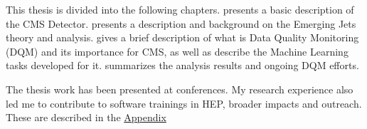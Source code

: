 This thesis is divided into the following chapters.
 presents a basic description of the CMS Detector.
 presents a description and background on the Emerging Jets theory and analysis.
 gives a brief description of what is Data Quality Monitoring (DQM) and its importance for CMS, as well as describe the Machine Learning tasks developed for it.
 summarizes the analysis results and ongoing DQM efforts.



The thesis work has been presented at conferences.
\cite{user-meeting2023,prism2022,DPF,prism2019}
My research experience also led me to contribute to software trainings in HEP, broader impacts and outreach.
These are described in the \hyperlink{appendix}{Appendix}


